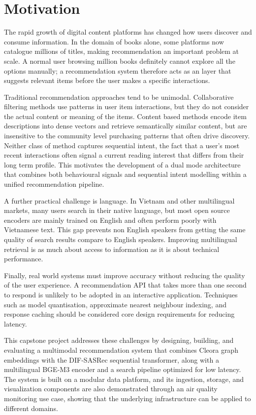 \section{Motivation}
\label{sec:motivation}

The rapid growth of digital content platforms has changed how users discover and consume information.
In the domain of books alone, some platforms now catalogue millions of titles, making recommendation an important problem at scale.
A normal user browsing million books definitely cannot explore all the options manually; a recommendation system therefore acts as an layer that suggests relevant items before the user makes a specific interactions.

Traditional recommendation approaches tend to be unimodal.
Collaborative filtering methods use patterns in user item interactions, but they do not consider the actual content or meaning of the items.
Content based methods encode item descriptions into dense vectors and retrieve semantically similar content, but are insensitive to the community level purchasing patterns that often drive discovery.
Neither class of method captures sequential intent, the fact that a user's most recent interactions often signal a current reading interest that differs from their long term profile.
This motivates the development of a dual mode architecture that combines both behavioural signals and sequential intent modelling within a unified recommendation pipeline.

A further practical challenge is language. In Vietnam and other multilingual markets, many users search in their native language, but most open source encoders are mainly trained on English and often perform poorly with Vietnamese text.
This gap prevents non English speakers from getting the same quality of search results compare to English speakers.
Improving multilingual retrieval is as much about access to information as it is about technical performance.

Finally, real world systems must improve accuracy without reducing the quality of the user experience.
A recommendation API that takes more than one second to respond is unlikely to be adopted in an interactive application.
Techniques such as model quantisation, approximate nearest neighbour indexing, and response caching should be considered core design requirements for reducing latency.

This capstone project addresses these challenges by designing, building, and evaluating a multimodal recommendation system that combines Cleora graph embeddings with the DIF-SASRec sequential transformer, along with a multilingual BGE-M3 encoder and a search pipeline optimized for low latency.
The system is built on a modular data platform, and its ingestion, storage, and visualization components are also demonstrated through an air quality monitoring use case, showing that the underlying infrastructure can be applied to different domains.

